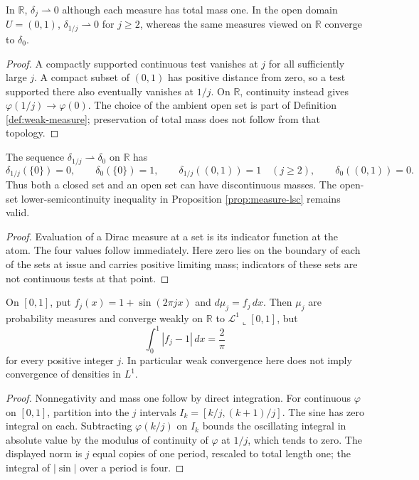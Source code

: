 \begin{example}\label{ex:escaping-mass}
In $\mathbb R$, $\delta_j\rightharpoonup0$ although each measure has total mass one. In the open domain $U=(0,1)$, $\delta_{1/j}\rightharpoonup0$ for $j\geq2$, whereas the same measures viewed on $\mathbb R$ converge to $\delta_0$.
\end{example}
\begin{proof}
A compactly supported continuous test vanishes at $j$ for all sufficiently large $j$. A compact subset of $(0,1)$ has positive distance from zero, so a test supported there also eventually vanishes at $1/j$. On $\mathbb R$, continuity instead gives $\varphi(1/j)\to\varphi(0)$. The choice of the ambient open set is part of Definition \ref{def:weak-measure}; preservation of total mass does not follow from that topology.
\end{proof}

\begin{example}\label{ex:weak-borel-discontinuity}
The sequence $\delta_{1/j}\rightharpoonup\delta_0$ on $\mathbb R$ has
\[
 \delta_{1/j}(\{0\})=0,\qquad\delta_0(\{0\})=1,
 \qquad \delta_{1/j}((0,1))=1\quad(j\geq2),\qquad\delta_0((0,1))=0.
\]
Thus both a closed set and an open set can have discontinuous masses. The open-set lower-semicontinuity inequality in Proposition \ref{prop:measure-lsc} remains valid.
\end{example}
\begin{proof}
Evaluation of a Dirac measure at a set is its indicator function at the atom. The four values follow immediately. Here zero lies on the boundary of each of the sets at issue and carries positive limiting mass; indicators of these sets are not continuous tests at that point.
\end{proof}

\begin{example}\label{ex:oscillating-densities}
On $[0,1]$, put $f_j(x)=1+\sin(2\pi jx)$ and $d\mu_j=f_j\,dx$. Then $\mu_j$ are probability measures and converge weakly on $\mathbb R$ to $\mathcal L^1\llcorner[0,1]$, but
\[
 \int_0^1|f_j-1|\,dx=\frac2\pi
\]
for every positive integer $j$. In particular weak convergence here does not imply convergence of densities in $L^1$.
\end{example}
\begin{proof}
Nonnegativity and mass one follow by direct integration. For continuous $\varphi$ on $[0,1]$, partition into the $j$ intervals $I_k=[k/j,(k+1)/j]$. The sine has zero integral on each. Subtracting $\varphi(k/j)$ on $I_k$ bounds the oscillating integral in absolute value by the modulus of continuity of $\varphi$ at $1/j$, which tends to zero. The displayed norm is $j$ equal copies of one period, rescaled to total length one; the integral of $|\sin|$ over a period is four.
\end{proof}

